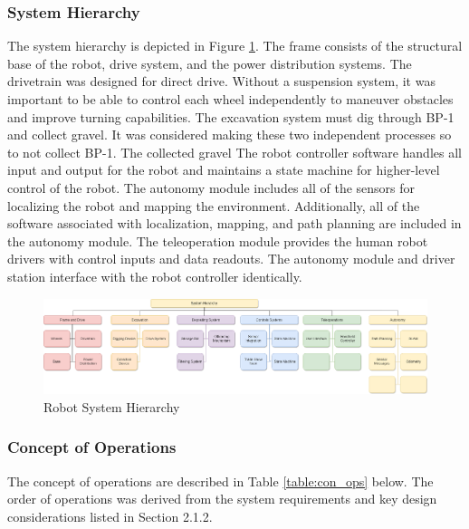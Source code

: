 \documentclass[class=article, crop=false]{standalone}
\begin{document}
	\subsubsection{System Hierarchy}
	The system hierarchy is depicted in Figure \ref{fig:system_hierarchy}. The frame consists of the structural base of the robot, drive system, and the power distribution systems. The drivetrain was designed for direct drive. Without a suspension system, it was important to be able to control each wheel independently to maneuver obstacles and improve turning capabilities. The excavation system must dig through BP-1 and collect gravel. It was considered making these two independent processes so to not collect BP-1.  The collected gravel The robot controller software handles all input and output for the robot and maintains a state machine for higher-level control of the robot. The autonomy module includes all of the sensors for localizing the robot and mapping the environment. Additionally, all of the software associated with localization, mapping, and path planning are included in the autonomy module. The teleoperation module provides the human robot drivers with control inputs and data readouts. The autonomy module and driver station interface with the robot controller identically.
	
	\FloatBarrier
		\begin{figure}[h]
			\centering
			\includegraphics[width=1.0\linewidth]{09_Figures/system_hierarchy.png}
			\caption{Robot System Hierarchy}
			\label{fig:system_hierarchy}
		\end{figure}
		\FloatBarrier
		
	\subsubsection{Concept of Operations}
	The concept of operations are described in Table \ref{table:con_ops} below. The order of operations was derived from the system requirements and key design considerations listed in Section 2.1.2.
	
\end{document}
